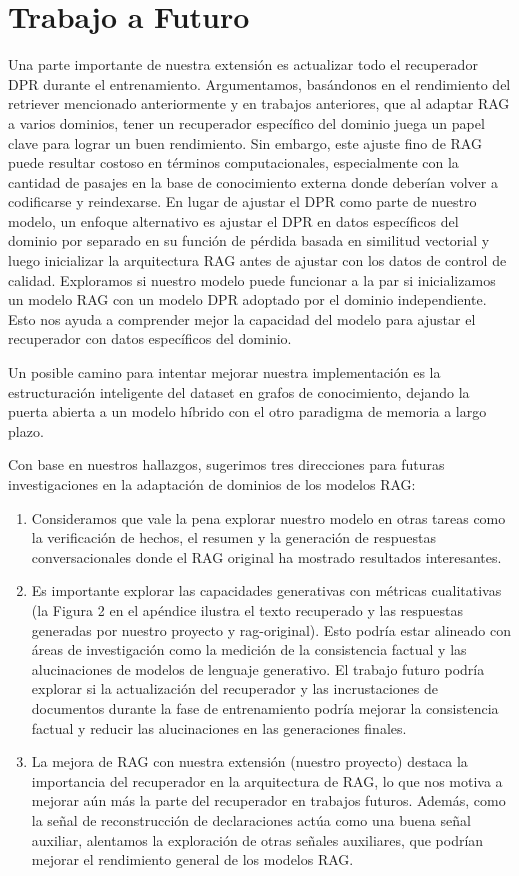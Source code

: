 \documentclass{article}
\begin{document}
\section{Trabajo a Futuro}

Una parte importante de nuestra extensión es actualizar todo el recuperador DPR durante el entrenamiento. Argumentamos, basándonos en el rendimiento del retriever mencionado anteriormente y en trabajos anteriores, que al adaptar RAG a varios dominios, tener un recuperador específico del dominio juega un papel clave para lograr un buen rendimiento. Sin embargo, este ajuste fino de RAG puede resultar costoso en términos computacionales, especialmente con la cantidad de pasajes en la base de conocimiento externa donde deberían volver a codificarse y reindexarse. En lugar de ajustar el DPR como parte de nuestro modelo, un enfoque alternativo es ajustar el DPR en datos específicos del dominio por separado en su función de pérdida basada en similitud vectorial y luego inicializar la arquitectura RAG antes de ajustar con los datos de control de calidad. Exploramos si nuestro modelo puede funcionar a la par si inicializamos un modelo RAG con un modelo DPR adoptado por el dominio independiente. Esto nos ayuda a comprender mejor la capacidad del modelo para ajustar el recuperador con datos específicos del dominio.

Un posible camino para intentar mejorar nuestra implementación es la estructuración inteligente del dataset en grafos de conocimiento, dejando la puerta abierta a un modelo híbrido con el otro paradigma de memoria a largo plazo.

Con base en nuestros hallazgos, sugerimos tres direcciones para futuras investigaciones en la adaptación de dominios de los modelos RAG:

\begin{enumerate}
    \item Consideramos que vale la pena explorar nuestro modelo en otras tareas como la verificación de hechos, el resumen y la generación de respuestas conversacionales donde el RAG original ha mostrado resultados interesantes.
    \item Es importante explorar las capacidades generativas con métricas cualitativas (la Figura 2 en el apéndice ilustra el texto recuperado y las respuestas generadas por nuestro proyecto y rag-original). Esto podría estar alineado con áreas de investigación como la medición de la consistencia factual y las alucinaciones de modelos de lenguaje generativo. El trabajo futuro podría explorar si la actualización del recuperador y las incrustaciones de documentos durante la fase de entrenamiento podría mejorar la consistencia factual y reducir las alucinaciones en las generaciones finales.
    \item La mejora de RAG con nuestra extensión (nuestro proyecto) destaca la importancia del recuperador en la arquitectura de RAG, lo que nos motiva a mejorar aún más la parte del recuperador en trabajos futuros. Además, como la señal de reconstrucción de declaraciones actúa como una buena señal auxiliar, alentamos la exploración de otras señales auxiliares, que podrían mejorar el rendimiento general de los modelos RAG.
\end{enumerate}
\end{document}
